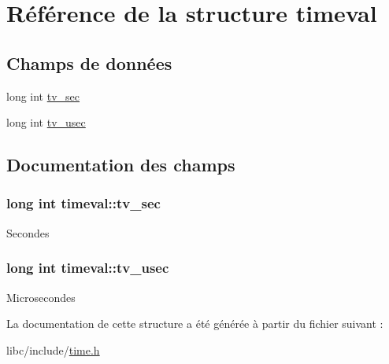\hypertarget{structtimeval}{\section{\-Référence de la structure timeval}
\label{structtimeval}
}
\subsection*{\-Champs de données}
\begin{DoxyCompactItemize}
\item 
long int \hyperlink{structtimeval_ab6fac84a084d017bb157f4681dafe8a3}{tv\-\_\-sec}
\item 
long int \hyperlink{structtimeval_a6f90a236deb00a89fe3dd8023d525d9c}{tv\-\_\-usec}
\end{DoxyCompactItemize}


\subsection{\-Documentation des champs}
\hypertarget{structtimeval_ab6fac84a084d017bb157f4681dafe8a3}{
\subsubsection[{tv\-\_\-sec}]{\setlength{\rightskip}{0pt plus 5cm}long int {\bf timeval\-::tv\-\_\-sec}}}\label{structtimeval_ab6fac84a084d017bb157f4681dafe8a3}
\-Secondes \hypertarget{structtimeval_a6f90a236deb00a89fe3dd8023d525d9c}{
\subsubsection[{tv\-\_\-usec}]{\setlength{\rightskip}{0pt plus 5cm}long int {\bf timeval\-::tv\-\_\-usec}}}\label{structtimeval_a6f90a236deb00a89fe3dd8023d525d9c}
\-Microsecondes 

\-La documentation de cette structure a été générée à partir du fichier suivant \-:\begin{DoxyCompactItemize}
\item 
libc/include/\hyperlink{time_8h}{time.\-h}\end{DoxyCompactItemize}
